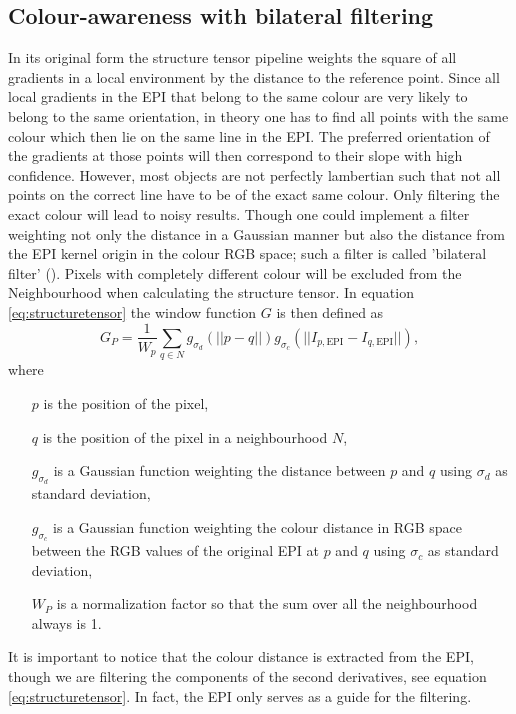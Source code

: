 \documentclass  [
  paper    = a4,
  BCOR     = 10mm,
  twoside,
  fontsize = 12pt,
  fleqn,
  toc      = bibnumbered,
  toc      = listofnumbered,
  numbers  = noendperiod,
  headings = normal,
  listof   = leveldown,
  version  = 3.03
]                                       {scrreprt}
\begin{document}
 \subsection{Colour-awareness with bilateral filtering}
 \label{sec:bilateral}
 In its original form the structure tensor pipeline weights the square of all gradients in a local environment by the distance to the reference point. Since all local gradients in the EPI that belong to the same colour are very likely to belong to the same orientation, in theory one has to find all points with the same colour which then lie on the same line in the EPI. The preferred orientation of the gradients at those points will then correspond to their slope with high confidence. However, most objects are not perfectly lambertian such that not all points on the correct line have to be of the exact same colour. Only filtering the exact colour will lead to noisy results. Though one could implement a filter weighting not only the distance in a Gaussian manner but also the distance from the  EPI kernel origin in the colour RGB space; such a filter is called 'bilateral filter' (\cite{tomasi1998bilateral}). Pixels with completely different colour will be excluded from the Neighbourhood when calculating the structure tensor. In equation \ref{eq:structuretensor} the window function $G$ is then defined as 
 \begin{equation}\label{eq:bilateral}
 G_P = \frac{1}{W_p}\sum_{q\in N} g_{\sigma_d}(||p-q||) g_{\sigma_c}(||I_{p, \text{EPI}}-I_{q, \text{EPI}}||),
 \end{equation}
 where
 \begin{itemize}
 	\item[$p$] is the position of the pixel,
 	\item[$q$] is the position of the pixel in a neighbourhood $N$,
 	\item[ $g_{\sigma_d}$] is a Gaussian function weighting the distance between $p$ and $q$ using $\sigma_d$ as standard deviation,
 	\item[ $g_{\sigma_c}$] is a Gaussian function weighting the colour distance in RGB space between the  RGB values of the original EPI at $p$ and $q$ using $\sigma_c$ as standard deviation,
 	\item[$W_P$] is a normalization factor so that the sum over all the neighbourhood always is 1. 
 \end{itemize}


It is important to notice that the colour distance is extracted from the EPI, though we are filtering the components of the second derivatives, see equation \ref{eq:structuretensor}. In fact, the EPI only serves as a guide for the filtering.
\end{document}
